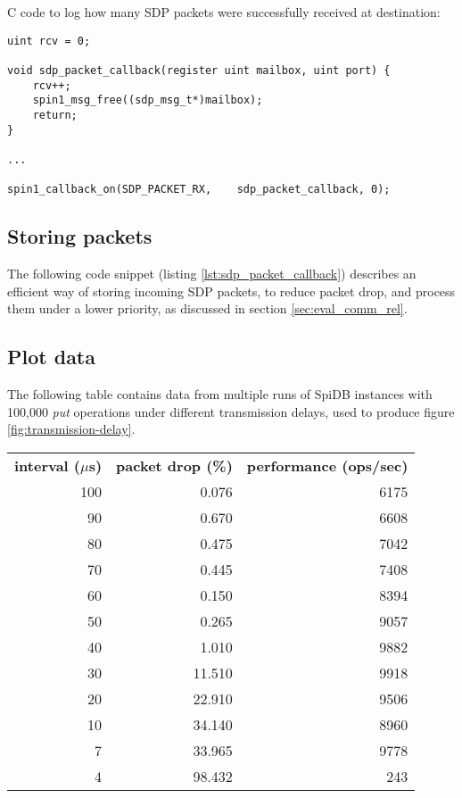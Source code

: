 C code to log how many SDP packets were successfully received at destination:

\begin{lstlisting}[caption={Destination}]
uint rcv = 0;

void sdp_packet_callback(register uint mailbox, uint port) {
    rcv++;
    spin1_msg_free((sdp_msg_t*)mailbox);
    return;
}

...

spin1_callback_on(SDP_PACKET_RX,    sdp_packet_callback, 0);

\end{lstlisting}


\subsection{Storing packets}
The following code snippet (listing \ref{lst:sdp_packet_callback}) describes an efficient way of storing incoming SDP packets, to reduce packet drop, and process them under a lower priority, as discussed in section \ref{sec:eval_comm_rel}.



\clearpage
\newpage

\subsection{Plot data}
The following table contains data from multiple runs of SpiDB instances with 100,000 \textit{put} operations under different transmission delays, used to produce figure \ref{fig:transmission-delay}.

\vspace{5mm}

\begin{tabular}{ r | r | r }
\textbf{interval ($\mu$s)} & \textbf{packet drop (\%)} & \textbf{performance (ops/sec)}  \\
100 & 0.076 	& 6175 \\
90	& 0.670		& 6608 \\
80	& 0.475		& 7042 \\
70	& 0.445		& 7408 \\
60	& 0.150		& 8394 \\
50	& 0.265		& 9057 \\
40	& 1.010		& 9882 \\
30	& 11.510	& 9918 \\
20	& 22.910	& 9506 \\ 
10	& 34.140	& 8960 \\
7	& 33.965 	& 9778 \\
4	& 98.432 	& 243 \\
\end{tabular}